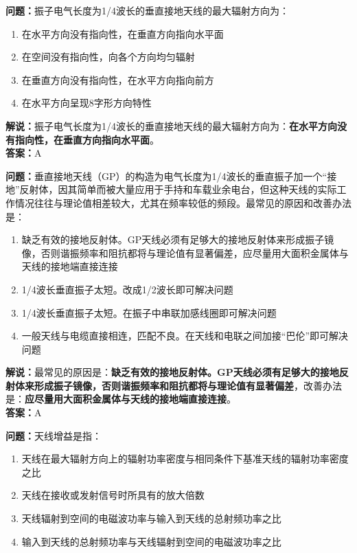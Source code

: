 \textbf{问题：}振子电气长度为1/4波长的垂直接地天线的最大辐射方向为：

\begin{enumerate}[label=\Alph*), leftmargin=1cm]
	\item 在水平方向没有指向性，在垂直方向指向水平面
	\item 在空间没有指向性，向各个方向均匀辐射
	\item 在垂直方向没有指向性，在水平方向指向前方
	\item 在水平方向呈现8字形方向特性
\end{enumerate}

\textbf{解说：}振子电气长度为1/4波长的垂直接地天线的最大辐射方向为：\textbf{在水平方向没有指向性，在垂直方向指向水平面}。\\\textbf{答案：}A%



\textbf{问题：}垂直接地天线（GP）的构造为电气长度为1/4波长的垂直振子加一个“接地”反射体，因其简单而被大量应用于手持和车载业余电台，但这种天线的实际工作情况往往与理论值相差较大，尤其在频率较低的频段。最常见的原因和改善办法是：

\begin{enumerate}[label=\Alph*), leftmargin=1cm]
	\item 缺乏有效的接地反射体。GP天线必须有足够大的接地反射体来形成振子镜像，否则谐振频率和阻抗都将与理论值有显著偏差，应尽量用大面积金属体与天线的接地端直接连接
	\item 1/4波长垂直振子太短。改成1/2波长即可解决问题
	\item 1/4波长垂直振子太短。在振子中串联加感线圈即可解决问题
	\item 一般天线与电缆直接相连，匹配不良。在天线和电联之间加接“巴伦”即可解决问题
\end{enumerate}

\textbf{解说：}最常见的原因是：\textbf{缺乏有效的接地反射体。GP天线必须有足够大的接地反射体来形成振子镜像，否则谐振频率和阻抗都将与理论值有显著偏差}，改善办法是：\textbf{应尽量用大面积金属体与天线的接地端直接连接}。\\\textbf{答案：}A



\textbf{问题：}天线增益是指：

\begin{enumerate}[label=\Alph*), leftmargin=1cm]
	\item 天线在最大辐射方向上的辐射功率密度与相同条件下基准天线的辐射功率密度之比
	\item 天线在接收或发射信号时所具有的放大倍数
	\item 天线辐射到空间的电磁波功率与输入到天线的总射频功率之比
	\item 输入到天线的总射频功率与天线辐射到空间的电磁波功率之比
\end{enumerate}

